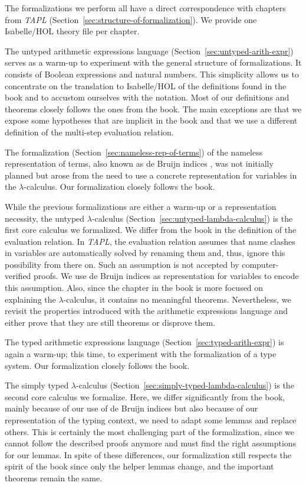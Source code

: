 The formalizations we perform all have a direct correspondence with chapters from \emph{TAPL}
(Section~\ref{sec:structure-of-formalization}). We provide one Isabelle/HOL theory file per chapter.

The untyped arithmetic expressions language (Section~\ref{sec:untyped-arith-expr}) serves as a
warm-up to experiment with the general structure of formalizations. It consists of Boolean
expressions and natural numbers. This simplicity allows us to concentrate on the translation to
Isabelle/HOL of the definitions found in the book and to accustom ourselves with the notation. Most
of our definitions and theorems closely follows the ones from the book. The main exceptions are
that we expose some hypotheses that are implicit in the book and that we use a different definition
of the multi-step evaluation relation.

The formalization (Section~\ref{sec:nameless-rep-of-terms}) of the nameless representation of terms,
also known as de Bruijn indices \cite{bruijn-1972-indices}, was not initially planned but arose
from the need to use a concrete representation for variables in the $\lambda$-calculus. Our
formalization closely follows the book.

While the previous formalizations are either a warm-up or a representation necessity, the untyped
$\lambda$-calculus (Section~\ref{sec:untyped-lambda-calculus}) is the first core calculus we
formalized. We differ from the book in the definition of the evaluation relation. In \emph{TAPL},
the evaluation relation assumes that name clashes in variables are automatically solved by renaming
them and, thus, ignore this possibility from there on. Such an assumption is not accepted by
computer-verified proofs. We use de Bruijn indices as representation for variables to encode this
assumption. Also, since the chapter in the book is more focused on explaining the
$\lambda$-calculus, it contains no meaningful theorems. Nevertheless, we revisit the properties
introduced with the arithmetic expressions language and either prove that they are still theorems or
disprove them.

The typed arithmetic expressions language (Section~\ref{sec:typed-arith-expr}) is again a warm-up;
this time, to experiment with the formalization of a type system. Our formalization closely follows
the book.

The simply typed $\lambda$-calculus (Section~\ref{sec:simply-typed-lambda-calculus}) is the second
core calculus we formalize. Here, we differ significantly from the book, mainly because of our use
of de Bruijn indices but also because of our representation of the typing context, we need to
adapt some lemmas and replace others. This is certainly the most challenging part of the
formalization, since we cannot follow the described proofs anymore and must find the right
assumptions for our lemmas. In spite of these differences, our formalization still respects the
spirit of the book since only the helper lemmas change, and the important theorems remain the same.

